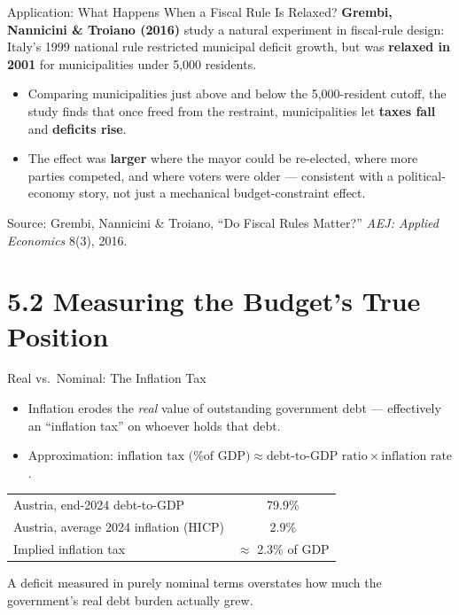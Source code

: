 \documentclass[11pt,aspectratio=169]{beamer}
\newcommand{\srcnote}[1]{{\footnotesize\color{wugray}Source: #1}}
\begin{document}
\begin{frame}{Application: What Happens When a Fiscal Rule Is Relaxed?}
  \small
  \textbf{Grembi, Nannicini \& Troiano (2016)} study a natural experiment in fiscal-rule design: Italy's 1999 national rule restricted municipal deficit growth, but was \textbf{relaxed in 2001} for municipalities under 5{,}000 residents.
  \vspace{0.4em}
  \begin{itemize}
    \item Comparing municipalities just above and below the 5{,}000-resident cutoff, the study finds that once freed from the restraint, municipalities let \textbf{taxes fall} and \textbf{deficits rise}.
    \item The effect was \textbf{larger} where the mayor could be re-elected, where more parties competed, and where voters were older --- consistent with a political-economy story, not just a mechanical budget-constraint effect.
  \end{itemize}
 

  
  \srcnote{Grembi, Nannicini \& Troiano, ``Do Fiscal Rules Matter?'' \emph{AEJ: Applied Economics} 8(3), 2016.}
\end{frame}

\section{5.2 Measuring the Budget's True Position}

\begin{frame}{Real vs.\ Nominal: The Inflation Tax}
  \small
  \begin{itemize}
    \item Inflation erodes the \emph{real} value of outstanding government debt --- effectively an ``inflation tax'' on whoever holds that debt.
    \item Approximation: $\text{inflation tax (\% of GDP)} \approx \text{debt-to-GDP ratio} \times \text{inflation rate}$.
  \end{itemize}
  \vspace{0.3em}
  \begin{center}
  \begin{tabular}{@{}lc@{}}
    \toprule
    Austria, end-2024 debt-to-GDP & 79.9\% \\
    Austria, average 2024 inflation (HICP) & 2.9\% \\
    \midrule
    Implied inflation tax & $\approx$ 2.3\% of GDP \\
    \bottomrule
  \end{tabular}
  \end{center}
  \vspace{0.3em}

  A deficit measured in purely nominal terms overstates how much the government's real debt burden actually grew.\\
 
\end{frame}
\end{document}

